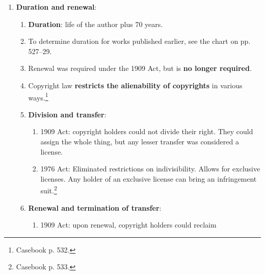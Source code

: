 \begin{enumerate}
\begin{enumerate}
\begin{enumerate}
            commissioned work is a work for hire if it falls into one of nine 
            enumerated categories (``work made for hire,'' \S\ 101). Courts 
            apply the common law agency rule. See \emph{CCNV v. Reid} and p.  
            512 top.
            \item \textbf{Joint work}: requires (1) a copyrightable work, (2) 
            two or more authors, and (3) intent to merge contributions into an 
            inseparable or interdependent unitary whole. \emph{Aalmuhammed v.  
            Lee}.
            \item \textbf{Collective works}: copyright in a contribution is 
            distinct from copyright in the entire collection. \S\ 201(c).
            \item (See ``Analyzing IP Ownership Problems.'')
        \end{enumerate}
        \item \textbf{Duration and renewal}:
        \begin{enumerate}
            \item \textbf{Duration}: life of the author plus 70 years.
            \item To determine duration for works published earlier, see the 
            chart on pp. 527--29.
            \item Renewal was required under the 1909 Act, but is \textbf{no 
            longer required}.
            \item Copyright law \textbf{restricts the alienability of 
            copyrights} in various ways.\footnote{Casebook p. 532.}
            \item \textbf{Division and transfer}:
            \begin{enumerate}
                \item 1909 Act: copyright holders could not divide their 
                right. They could assign the whole thing, but any lesser 
                transfer was considered a license.
                \item 1976 Act: Eliminated restrictions on indivisibility.  
                Allows for exclusive licenses. Any holder of an exclusive 
                license can bring an infringement suit.\footnote{Casebook p.  
                533.}
            \end{enumerate}
            \item \textbf{Renewal and termination of transfer}:
            \begin{enumerate}
                \item 1909 Act: upon renewal, copyright holders could reclaim 

\end{enumerate}
\end{enumerate}
\end{enumerate}
\end{enumerate}
